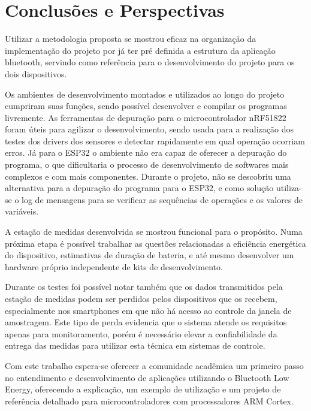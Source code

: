\section{Conclusões e Perspectivas}

Utilizar a metodologia proposta se mostrou eficaz na organização da
implementação do projeto por já ter pré definida a estrutura da aplicação
bluetooth, servindo como referência para o desenvolvimento do projeto para os
dois dispositivos. 

Os ambientes de desenvolvimento montados e utilizados ao longo do projeto
cumpriram suas funções, sendo possível desenvolver e compilar os programas
livremente. As ferramentas de depuração para o microcontrolador nRF51822 foram
úteis para agilizar o desenvolvimento, sendo usada para a realização dos
testes dos drivers dos sensores e detectar rapidamente em qual operação ocorriam
erros. Já para o ESP32 o ambiente não era capaz de oferecer a depuração do
programa, o que dificultaria o processo de desenvolvimento de softwares mais
complexos e com mais componentes. Durante o projeto, não se descobriu uma
alternativa para a depuração do programa para o ESP32, e como solução utiliza-se
o log de mensagens para se verificar as sequências de operações e os valores de
variáveis. 

A estação de medidas desenvolvida se mostrou funcional para o propósito. Numa
próxima etapa é possível trabalhar as questões relacionadas a eficiência
energética do dispositivo, estimativas de duração de bateria, e até mesmo
desenvolver um hardware próprio independente de kits de desenvolvimento.

Durante os testes foi possível notar também que os dados transmitidos pela
estação de medidas podem ser perdidos pelos dispositivos que os recebem,
especialmente nos smartphones em que não há acesso ao controle da janela de
amostragem. Este tipo de perda evidencia que o sistema atende os requisitos
apenas para monitoramento, porém é necessário elevar a confiabilidade da entrega
das medidas para utilizar esta técnica em sistemas de controle.

Com este trabalho espera-se oferecer a comunidade acadêmica um primeiro passo no
entendimento e desenvolvimento de aplicações utilizando o Bluetooth Low Energy,
oferecendo a explicação, um exemplo de utilização e um projeto de referência
detalhado para microcontroladores com processadores ARM Cortex.
